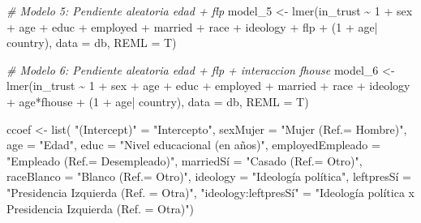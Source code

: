 \documentclass[
  12pt,
  a4paper,
]{article}
\newenvironment{Shaded}{\begin{snugshade}}{\end{snugshade}}
\newcommand{\AttributeTok}[1]{\textcolor[rgb]{0.77,0.63,0.00}{#1}}
\newcommand{\CommentTok}[1]{\textcolor[rgb]{0.56,0.35,0.01}{\textit{#1}}}
\newcommand{\DecValTok}[1]{\textcolor[rgb]{0.00,0.00,0.81}{#1}}
\newcommand{\FunctionTok}[1]{\textcolor[rgb]{0.00,0.00,0.00}{#1}}
\newcommand{\NormalTok}[1]{#1}
\newcommand{\OtherTok}[1]{\textcolor[rgb]{0.56,0.35,0.01}{#1}}
\newcommand{\SpecialCharTok}[1]{\textcolor[rgb]{0.00,0.00,0.00}{#1}}
\newcommand{\StringTok}[1]{\textcolor[rgb]{0.31,0.60,0.02}{#1}}
\begin{document}
\begin{Shaded}
\begin{Highlighting}[]
\CommentTok{\# Modelo 5: Pendiente aleatoria edad + flp}
\NormalTok{model\_5 }\OtherTok{\textless{}{-}} \FunctionTok{lmer}\NormalTok{(in\_trust }\SpecialCharTok{\textasciitilde{}} \DecValTok{1} \SpecialCharTok{+}\NormalTok{ sex }\SpecialCharTok{+}\NormalTok{ age }\SpecialCharTok{+}\NormalTok{ educ }\SpecialCharTok{+}\NormalTok{ employed }\SpecialCharTok{+}\NormalTok{ married }\SpecialCharTok{+}
\NormalTok{                race }\SpecialCharTok{+}\NormalTok{ ideology }\SpecialCharTok{+}\NormalTok{ flp }\SpecialCharTok{+}\NormalTok{ (}\DecValTok{1} \SpecialCharTok{+}\NormalTok{ age}\SpecialCharTok{|}\NormalTok{ country),}
                \AttributeTok{data =}\NormalTok{ db, }
                \AttributeTok{REML =}\NormalTok{ T)}

\CommentTok{\# Modelo 6: Pendiente aleatoria edad + flp + interaccion fhouse}
\NormalTok{model\_6 }\OtherTok{\textless{}{-}} \FunctionTok{lmer}\NormalTok{(in\_trust }\SpecialCharTok{\textasciitilde{}} \DecValTok{1} \SpecialCharTok{+}\NormalTok{ sex }\SpecialCharTok{+}\NormalTok{ age }\SpecialCharTok{+}\NormalTok{ educ }\SpecialCharTok{+}\NormalTok{ employed }\SpecialCharTok{+}\NormalTok{ married }\SpecialCharTok{+}
\NormalTok{                race }\SpecialCharTok{+}\NormalTok{ ideology }\SpecialCharTok{+}\NormalTok{ age}\SpecialCharTok{*}\NormalTok{fhouse }\SpecialCharTok{+}\NormalTok{ (}\DecValTok{1} \SpecialCharTok{+}\NormalTok{ age}\SpecialCharTok{|}\NormalTok{ country),}
                \AttributeTok{data =}\NormalTok{ db, }
                \AttributeTok{REML =}\NormalTok{ T)}


\NormalTok{ccoef }\OtherTok{\textless{}{-}} \FunctionTok{list}\NormalTok{(}
  \StringTok{"(Intercept)"} \OtherTok{=} \StringTok{"Intercepto"}\NormalTok{,}
  \AttributeTok{sexMujer =} \StringTok{"Mujer (Ref.= Hombre)"}\NormalTok{,}
  \AttributeTok{age =} \StringTok{"Edad"}\NormalTok{,}
  \AttributeTok{educ =} \StringTok{"Nivel educacional (en años)"}\NormalTok{,}
  \AttributeTok{employedEmpleado =} \StringTok{"Empleado (Ref.= Desempleado)"}\NormalTok{,}
\NormalTok{  marriedSí }\OtherTok{=} \StringTok{"Casado (Ref.= Otro)"}\NormalTok{,}
  \AttributeTok{raceBlanco =} \StringTok{"Blanco (Ref.= Otro)"}\NormalTok{,}
  \AttributeTok{ideology =} \StringTok{"Ideología política"}\NormalTok{,}
\NormalTok{  leftpresSí }\OtherTok{=} \StringTok{"Presidencia Izquierda (Ref. = Otra)"}\NormalTok{,}
  \StringTok{"ideology:leftpresSí"} \OtherTok{=} \StringTok{"Ideología política x Presidencia Izquierda (Ref. = Otra)"}\NormalTok{)}



\end{Highlighting}
\end{Shaded}
\end{document}
